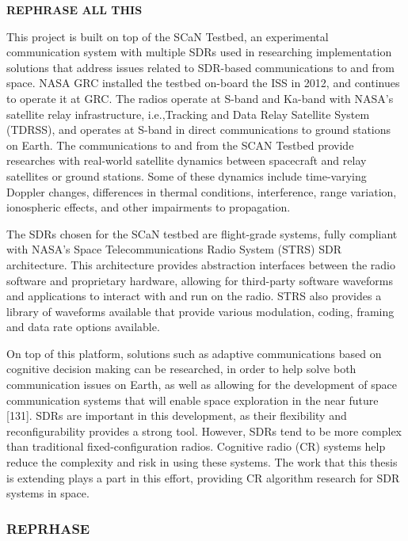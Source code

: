 \documentclass[11pt]{report}
\begin{document}
	\textbf{REPHRASE ALL THIS}
	\par This project is built on top of the SCaN Testbed, an experimental communication system with multiple SDRs used in researching implementation solutions that address issues related to SDR-based communications to and from space. NASA GRC installed the testbed on-board the ISS in 2012, and continues to operate it at GRC. The radios operate at S-band and Ka-band with NASA's satellite relay infrastructure, i.e.,Tracking and Data Relay Satellite System (TDRSS), and operates at S-band in direct communications to ground stations on Earth. The communications to and from the SCAN Testbed provide researches with real-world satellite dynamics between spacecraft and relay satellites or ground stations. Some of these dynamics include time-varying Doppler changes, differences in thermal conditions, interference, range variation, ionospheric effects, and other impairments to propagation.
	\par The SDRs chosen for the SCaN testbed are flight-grade systems, fully compliant with NASA's Space Telecommunications Radio System (STRS) SDR architecture. This architecture provides abstraction interfaces between the radio software and proprietary hardware, allowing for third-party software waveforms and applications to interact with and run on the radio. STRS also provides a library of waveforms available that provide various modulation, coding, framing and data rate options available. 
	\par On top of this platform, solutions such as adaptive communications based on cognitive decision making can be researched, in order to help solve both communication issues on Earth, as well as allowing for the development of space communication systems that will enable space exploration in the near future [131]. SDRs are important in this development, as their flexibility and reconfigurability provides a strong tool. However, SDRs tend to be more complex than traditional fixed-configuration radios. Cognitive radio (CR) systems help reduce the complexity and risk in using these systems. The work that this thesis is extending plays a part in this effort, providing CR algorithm research for SDR systems in space.    
	\subsubsection{REPRHASE}
\end{document}
